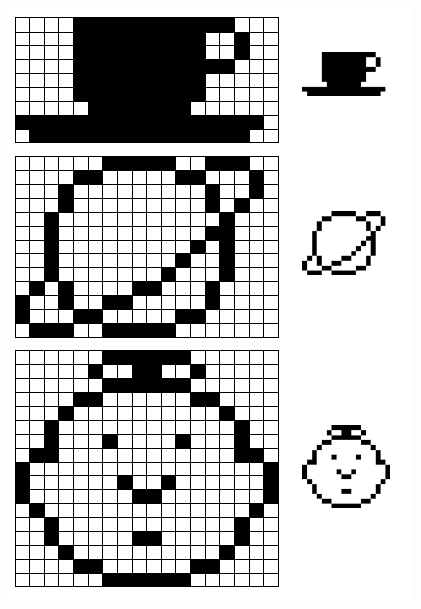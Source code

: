 \begin{Soln}{9}
	~\\	   \begin{center}
		\includegraphics[scale=0.8]{images/corr_exo_code_imgBin_alt.png}
	\end{center}

\end{Soln}
